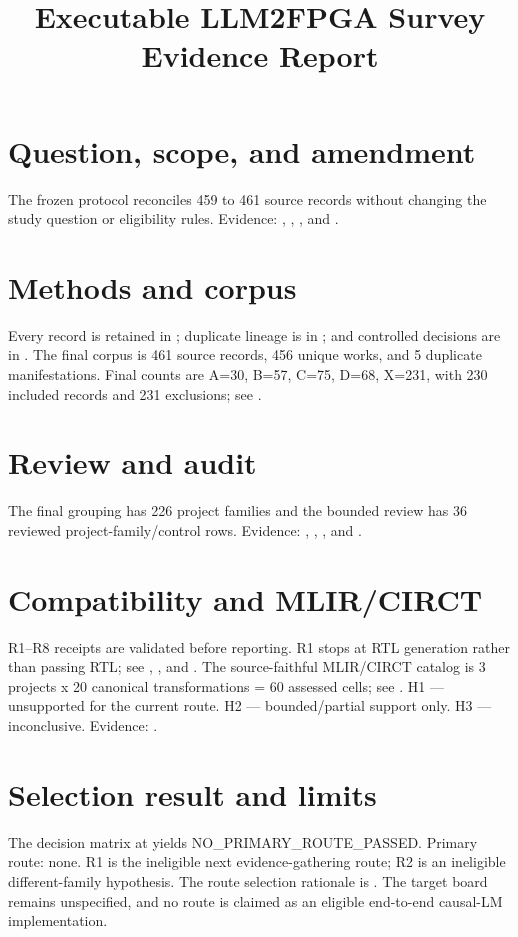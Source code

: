 \documentclass[11pt]{article}
\title{Executable LLM2FPGA Survey Evidence Report}
\author{}
\date{}
\begin{document}
\maketitle
\section{Question, scope, and amendment}
The frozen protocol reconciles 459 to 461 source records without changing the study question or eligibility rules. Evidence: , , , and .
\section{Methods and corpus}
Every record is retained in ; duplicate lineage is in ; and controlled decisions are in . The final corpus is 461 source records, 456 unique works, and 5 duplicate manifestations. Final counts are A=30, B=57, C=75, D=68, X=231, with 230 included records and 231 exclusions; see .
\section{Review and audit}
The final grouping has 226 project families and the bounded review has 36 reviewed project-family/control rows. Evidence: , , , and .
\section{Compatibility and MLIR/CIRCT}
R1--R8 receipts are validated before reporting. R1 stops at RTL generation rather than passing RTL; see , , and . The source-faithful MLIR/CIRCT catalog is 3 projects x 20 canonical transformations = 60 assessed cells; see . H1 --- unsupported for the current route. H2 --- bounded/partial support only. H3 --- inconclusive. Evidence: .
\section{Selection result and limits}
The decision matrix at  yields NO\_PRIMARY\_ROUTE\_PASSED. Primary route: none. R1 is the ineligible next evidence-gathering route; R2 is an ineligible different-family hypothesis. The route selection rationale is . The target board remains unspecified, and no route is claimed as an eligible end-to-end causal-LM implementation.
\end{document}

